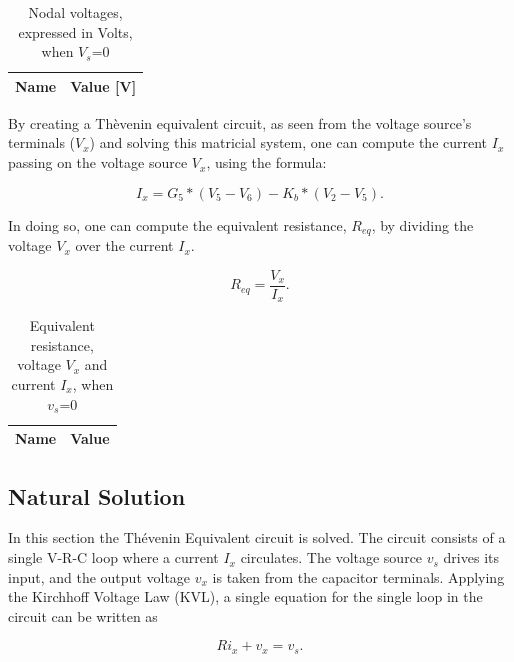 \begin{table} [H]
  \centering
  \begin{tabular}{|l|r|}
    \hline    
    {\bf Name} & {\bf Value [V]} \\ \hline
    
  \end{tabular}
  \caption{Nodal voltages, expressed in Volts, when $V_s$=0}
  \label{tab:volt2}
\end{table}

By creating a Thèvenin equivalent circuit, as seen from the voltage source's
terminals ($V_x$) and solving this matricial system, one can compute the current
$I_x$ passing on the voltage source $V_x$, using the formula:\par

\begin{equation}
  I_x = G_5 * (V_5 - V_6) - K_b * (V_2 - V_5).
  \label{eq:Ix}
\end{equation}

In doing so, one can compute the equivalent resistance, $R_{eq}$, by dividing the
voltage $V_x$ over the current $I_x$.

\begin{equation}
  R_{eq} = \frac{V_x}{I_x}.
  \label{eq:R_eq}
\end{equation}

\begin{table} [H]
  \centering
  \begin{tabular}{|l|r|}
    \hline    
    {\bf Name} & {\bf Value} \\ \hline
    
  \end{tabular}
  \caption{Equivalent resistance, voltage $V_x$ and current $I_x$, when $v_s$=0}
  \label{tab:req}
\end{table}


\newpage
\subsection{Natural Solution}
\label{subsec:nat}

In this section the Thévenin Equivalent circuit is solved.
The circuit consists of a single V-R-C loop where a current $I_{x}$ circulates. The
voltage source $v_s$ drives its input, and the output voltage $v_x$ is taken from
the capacitor terminals. Applying the Kirchhoff Voltage Law (KVL), a single
equation for the single loop in the circuit can be written as

\begin{equation}
  Ri_{x} + v_{x} = v_{s}.
  \label{eq:kvl}
\end{equation}

